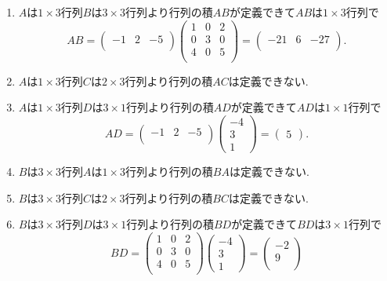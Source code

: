 \documentclass[dvipdfmx,a4paper,11pt]{article}
\theoremstyle{definition}
\begin{document}
\begin{enumerate}
\item $A$は$1 \times 3$行列$B$は$3 \times 3$行列より行列の積$AB$が定義できて$AB$は$1 \times 3$行列で
$$
AB 
= 
\begin{pmatrix} %
 -1 & 2 &-5  \\
 \end{pmatrix} 
  \begin{pmatrix} %
 1& 0 & 2\\
 0 & 3 & 0\\
 4 & 0 & 5 \\
 \end{pmatrix}
 =
 \begin{pmatrix} %
 -21& 6 &-27  \\
 \end{pmatrix}.
$$
\item $A$は$1 \times 3$行列$C$は$2 \times 3$行列より行列の積$AC$は定義できない.
\item $A$は$1 \times 3$行列$D$は$3 \times 1$行列より行列の積$AD$が定義できて$AD$は$1 \times 1$行列で
$$
AD
= 
\begin{pmatrix} %
 -1 & 2 &-5  \\
 \end{pmatrix} 
 \begin{pmatrix} %
 -4\\
 3 \\
 1
 \end{pmatrix}
 =
 \begin{pmatrix} %
5
 \end{pmatrix}.
$$
\item $B$は$3 \times 3$行列$A$は$1 \times 3$行列より行列の積$BA$は定義できない.
\item $B$は$3\times 3$行列$C$は$2 \times 3$行列より行列の積$BC$は定義できない.
\item $B$は$3\times 3$行列$D$は$3\times 1$行列より行列の積$BD$が定義できて$BD$は$3 \times 1$行列で
$$
BD
= 
\begin{pmatrix} %
 1& 0 & 2\\
 0 & 3 & 0\\
 4 & 0 & 5 \\
 \end{pmatrix} 
\begin{pmatrix} %
 -4\\
 3 \\
 1
 \end{pmatrix}
 =
 \begin{pmatrix} %
-2 \\
9 \\

\end{pmatrix}$$
\end{enumerate}
\end{document}
